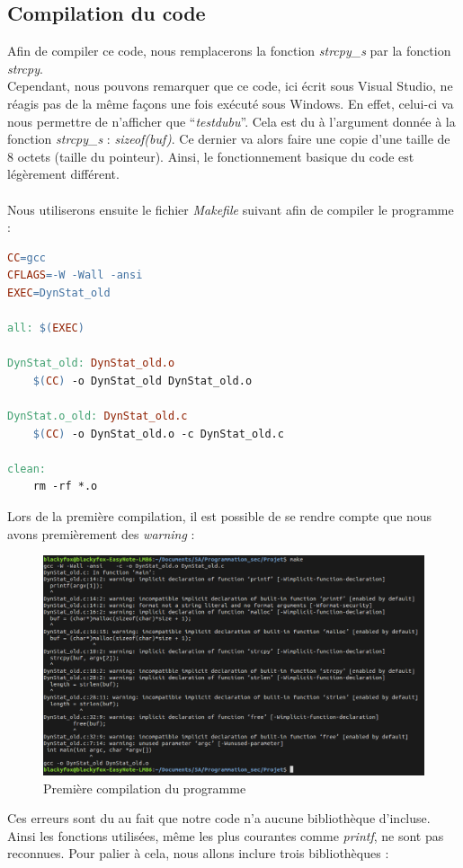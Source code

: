 \subsection{Compilation du code}
Afin de compiler ce code, nous remplacerons la fonction \textit{strcpy\_s} par la fonction \textit{strcpy}.\\
Cependant, nous pouvons remarquer que ce code, ici écrit sous Visual Studio, ne réagis pas de la même façons une fois exécuté sous Windows. En effet, celui-ci va nous permettre de n'afficher que \enquote{\textit{testdubu}}. Cela est du à l'argument donnée à la fonction \textit{strcpy\_s} : \textit{sizeof(buf)}. Ce dernier va alors faire une copie d'une taille de 8 octets (taille du pointeur). Ainsi, le fonctionnement basique du code est légèrement différent.\\~\\
Nous utiliserons ensuite le fichier \textit{Makefile} suivant afin de compiler le programme :
\newpage
\begin{lstlisting}[language=make]
CC=gcc
CFLAGS=-W -Wall -ansi 
EXEC=DynStat_old

all: $(EXEC)

DynStat_old: DynStat_old.o
	$(CC) -o DynStat_old DynStat_old.o

DynStat.o_old: DynStat_old.c
	$(CC) -o DynStat_old.o -c DynStat_old.c

clean:
	rm -rf *.o
\end{lstlisting}
Lors de la première compilation, il est possible de se rendre compte que nous avons premièrement des \textit{warning} :
\begin{figure}[H]
  \centering
  \includegraphics[width=.9\textwidth]{img/compile1.png}
  \caption{Première compilation du programme}
  \label{img:1}
\end{figure}
Ces erreurs sont du au fait que notre code n'a aucune bibliothèque d'incluse. Ainsi les fonctions utilisées, même les plus courantes comme \textit{printf}, ne sont pas reconnues. Pour palier à cela, nous allons inclure trois bibliothèques :
